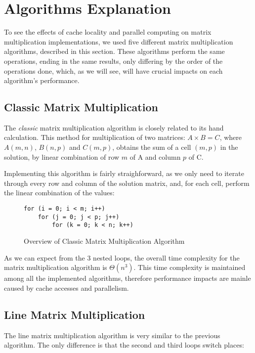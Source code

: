 \section{Algorithms Explanation} \label{section:algorithms}

To see the effects of cache locality and parallel computing on matrix multiplication implementations, we used five different matrix multiplication algorithms, described in this section. These algorithms perform the same operations, ending in the same results, only differing by the order of the operations done, which, as we will see, will have crucial impacts on each algorithm's performance.

\subsection{Classic Matrix Multiplication}

The \textit{classic} matrix multiplication algorithm is closely related to its hand calculation. This method for multiplication of two matrices: $A \times B = C$, where $A(m, n)$, $B(n, p)$ and $C(m, p)$, obtains the sum of a cell $(m,p)$ in the solution, by linear combination of row $m$ of A and column $p$ of C.

Implementing this algorithm is fairly straighforward, as we only need to iterate through every row and column of the solution matrix, and, for each cell, perform the linear combination of the values:

\begin{figure}[h!]
\begin{verbatim}
for (i = 0; i < m; i++)
    for (j = 0; j < p; j++)
        for (k = 0; k < n; k++)
\end{verbatim}
\caption{Overview of Classic Matrix Multiplication Algorithm}
\label{fig:algo:classic}
\end{figure}

As we can expect from the 3 nested loops, the overall time complexity for the matrix multiplication algorithm is $Θ(n^3)$. This time complexity is maintained among all the implemented algorithms, therefore performance impacts are mainle caused by cache accesses and parallelism.
    
\subsection{Line Matrix Multiplication}

The line matrix multiplication algorithm is very similar to the previous algorithm. The only difference is that the second and third loops switch places:

